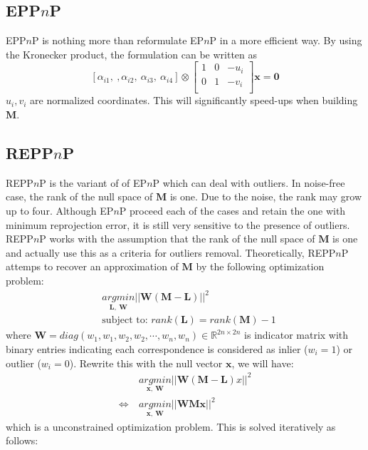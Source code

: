 \documentclass[a4paper]{article}
\begin{document}
\subsection{EPP$n$P}
EPP$n$P is nothing more than reformulate EP$n$P in a more efficient way. By using the Kronecker product, the formulation can be written as
$$
\left[\alpha_{i1},\ ,\alpha_{i2},\ \alpha_{i3},\ \alpha_{i4}\right] \otimes 
\left[
\begin{matrix}
1 & 0 & -u_i \\
0 & 1 & -v_i \\
\end{matrix}
\right]\mathbf{x}=\mathbf{0}
$$
$u_i, v_i$ are normalized coordinates. This will significantly speed-ups when building $\mathbf{M}$.

\subsection{REPP$n$P}
REPP$n$P is the variant of of EP$n$P which can deal with outliers. In noise-free case, the rank of the null space of $\mathbf{M}$ is one. Due to the noise, the rank may grow up to four. Although EP$n$P proceed each of the cases and retain the one with minimum reprojection error, it is still very sensitive to the presence of outliers. REPP$n$P works with the assumption that the rank of the null space of $\mathbf{M}$ is one and actually use this as a criteria for outliers removal. Theoretically, REPP$n$P attemps to recover an approximation of $\mathbf{M}$ by the following optimization problem:
\begin{align*}
&\underset{\mathbf{L},\ \mathbf{W}}{argmin} ||\mathbf{W}(\mathbf{M-L})||^2 \\
&\text{subject to: } rank(\mathbf{L})=rank(\mathbf{M})-1
\end{align*}
where $\mathbf{W}=diag(w_1,w_1,w_2,w_2,\cdots,w_n,w_n) \in \mathbb{R}^{2n\times 2n}$ is indicator matrix with binary entries indicating each correspondence is considered as inlier ($w_i=1$) or outlier ($w_i=0$). Rewrite this with the null vector $\mathbf{x}$, we will have:
\begin{align*}
&\underset{\mathbf{x},\ \mathbf{W}}{argmin} ||\mathbf{W}(\mathbf{M-L})x||^2 \\ \Leftrightarrow\ &\underset{\mathbf{x},\ \mathbf{W}}{argmin} ||\mathbf{W}\mathbf{Mx}||^2
\end{align*}
which is a unconstrained optimization problem. This is solved iteratively as follows:
\end{document}
